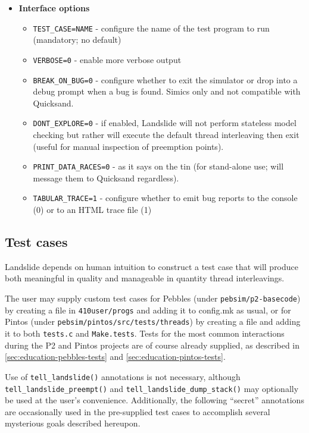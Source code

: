 \begin{itemize}
\item {\bf Interface options}
\begin{itemize}
	\item {\tt TEST\_CASE=NAME} - configure the name of the test program to run (mandatory; no default)
	\item {\tt VERBOSE=0} - enable more verbose output
	\item {\tt BREAK\_ON\_BUG=0} - configure whether to exit the simulator or drop into a debug prompt when a bug is found. Simics only and not compatible with Quicksand.
	\item {\tt DONT\_EXPLORE=0} - if enabled, Landslide will not perform stateless model checking but rather will execute the default thread interleaving then exit (useful for manual inspection of preemption points).
	\item {\tt PRINT\_DATA\_RACES=0} - as it says on the tin (for stand-alone use; will message them to Quicksand regardless).
	\item {\tt TABULAR\_TRACE=1} - configure whether to emit bug reports to the console (0) or to an HTML trace file (1)
\end{itemize}
\end{itemize}


\subsection{Test cases}
\label{sec:landslide-testcases}

Landslide depends on human intuition to construct a test case
that will produce both meaningful in quality and manageable in quantity thread interleavings.

The user may supply custom test cases
for Pebbles (under {\tt pebsim/p2-basecode})
by creating a file in {\tt 410user/progs} and adding it to config.mk as usual,
or for Pintos (under {\tt pebsim/pintos/src/tests/threads})
by creating a file and adding it to both {\tt tests.c} and {\tt Make.tests}.
Tests for the most common interactions during the P2 and Pintos projects are of course already supplied,
as described in \cref{sec:education-pebbles-tests} and \cref{sec:education-pintos-tests}.

Use of {\tt tell\_landslide()} annotations
is not necessary,
although {\tt tell\_landslide\_\allowbreak{}preempt()} and {\tt tell\_landslide\_dump\_stack()}
may optionally be used at the user's convenience.
Additionally, the following ``secret'' annotations
are occasionally used in the pre-supplied test cases
to accomplish several mysterious goals described hereupon.

